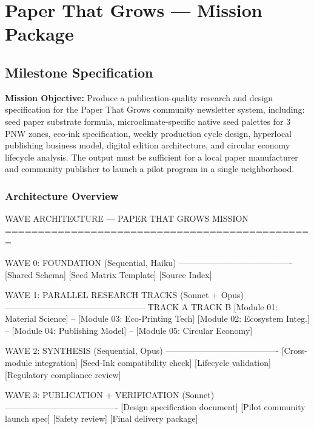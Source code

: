 \documentclass[11pt,letterpaper]{article}
\newcommand{\stageheader}[2]{%
  \noindent\colorbox{#2}{\makebox[\textwidth][l]{%
    \textcolor{white}{\bfseries\sffamily\hspace{6pt}#1\hspace{6pt}}}}%
  \vspace{0.5em}\par%
}
\begin{document}
\newpage

\stageheader{STAGE 3 --- MISSION PACKAGE}{stageC}

\section{Paper That Grows --- Mission Package}

\subsection{Milestone Specification}

\textbf{Mission Objective:} Produce a publication-quality research and design specification for the Paper That Grows community newsletter system, including: seed paper substrate formula, microclimate-specific native seed palettes for 3 PNW zones, eco-ink specification, weekly production cycle design, hyperlocal publishing business model, digital edition architecture, and circular economy lifecycle analysis. The output must be sufficient for a local paper manufacturer and community publisher to launch a pilot program in a single neighborhood.

\subsubsection{Architecture Overview}

\begin{asciibox}
WAVE ARCHITECTURE --- PAPER THAT GROWS MISSION
===============================================

  WAVE 0: FOUNDATION (Sequential, Haiku)
  ----------------------------------------
  [Shared Schema] [Seed Matrix Template] [Source Index]

  WAVE 1: PARALLEL RESEARCH TRACKS (Sonnet + Opus)
  --------------------------------------------------
  TRACK A                          TRACK B
  [Module 01: Material Science] -- [Module 03: Eco-Printing Tech]
  [Module 02: Ecosystem Integ.] -- [Module 04: Publishing Model]
                                -- [Module 05: Circular Economy]

  WAVE 2: SYNTHESIS (Sequential, Opus)
  ----------------------------------------
  [Cross-module integration] [Seed-Ink compatibility check]
  [Lifecycle validation] [Regulatory compliance review]

  WAVE 3: PUBLICATION + VERIFICATION (Sonnet)
  ----------------------------------------
  [Design specification document] [Pilot community launch spec]
  [Safety review] [Final delivery package]
\end{asciibox}
\end{document}
